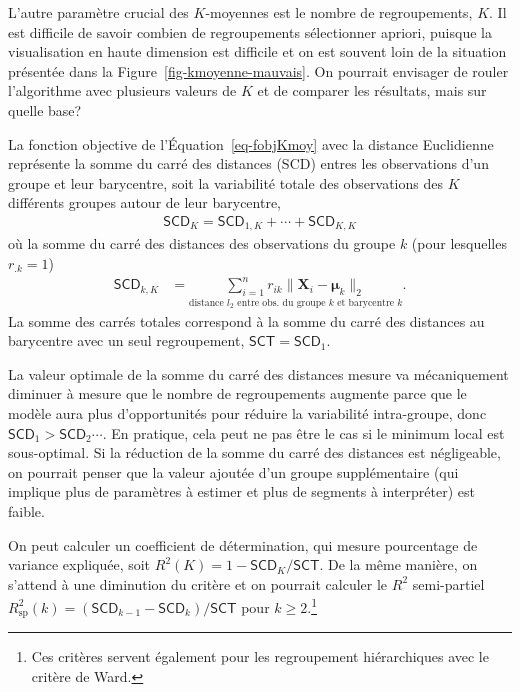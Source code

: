 \documentclass[
  11pt,
  letterpaper,
]{scrbook}
\theoremstyle{definition}
\theoremstyle{remark}
\begin{document}
L'autre paramètre crucial des \(K\)-moyennes est le nombre de
regroupements, \(K\). Il est difficile de savoir combien de
regroupements sélectionner apriori, puisque la visualisation en haute
dimension est difficile et on est souvent loin de la situation présentée
dans la Figure~\ref{fig-kmoyenne-mauvais}. On pourrait envisager de
rouler l'algorithme avec plusieurs valeurs de \(K\) et de comparer les
résultats, mais sur quelle base?

La fonction objective de l'Équation~\ref{eq-fobjKmoy} avec la distance
Euclidienne représente la somme du carré des distances (SCD) entres les
observations d'un groupe et leur barycentre, soit la variabilité totale
des observations des \(K\) différents groupes autour de leur barycentre,
\begin{align*}
\mathsf{SCD}_K = \mathsf{SCD}_{1,K} + \cdots + \mathsf{SCD}_{K,K}
\end{align*} où la somme du carré des distances des observations du
groupe \(k\) (pour lesquelles \(r_{.k}=1\)) \begin{align*}
\mathsf{SCD}_{k,K} &= \underset{\mbox{distance $l_2$ entre obs. du groupe $k$ et barycentre $k$}}{\sum_{i=1}^n r_{ik}\|\mathbf{X}_i -  \boldsymbol{\mu}_{k}\|_2}.
\end{align*} La somme des carrés totales correspond à la somme du carré
des distances au barycentre avec un seul regroupement,
\(\mathsf{SCT} = \mathsf{SCD}_{1}\).

La valeur optimale de la somme du carré des distances mesure va
mécaniquement diminuer à mesure que le nombre de regroupements augmente
parce que le modèle aura plus d'opportunités pour réduire la variabilité
intra-groupe, donc \(\mathsf{SCD}_1 > \mathsf{SCD}_2 \cdots\). En
pratique, cela peut ne pas être le cas si le minimum local est
sous-optimal. Si la réduction de la somme du carré des distances est
négligeable, on pourrait penser que la valeur ajoutée d'un groupe
supplémentaire (qui implique plus de paramètres à estimer et plus de
segments à interpréter) est faible.

On peut calculer un coefficient de détermination, qui mesure pourcentage
de variance expliquée, soit \(R^2(K) = 1-\mathsf{SCD}_K/\mathsf{SCT}\).
De la même manière, on s'attend à une diminution du critère et on
pourrait calculer le \(R^2\) semi-partiel
\(R^2_{\mathrm{sp}}(k) = (\mathsf{SCD}_{k-1} - \mathsf{SCD}_{k})/\mathsf{SCT}\)
pour \(k \geq 2\).\footnote{Ces critères servent également pour les
  regroupement hiérarchiques avec le critère de Ward.}
\end{document}
